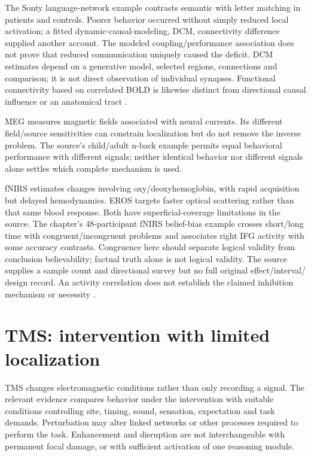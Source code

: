 The Sonty language-network example contrasts semantic with letter
matching in patients and controls. Poorer behavior occurred without
simply reduced local activation; a fitted dynamic-causal-modeling,
DCM, connectivity difference supplied another account. The modeled
coupling/performance association does not prove that reduced
communication uniquely caused the deficit. DCM estimates depend
on a generative model, selected regions, connections and comparison;
it is not direct observation of individual synapses. Functional
connectivity based on correlated BOLD is likewise distinct from
directional causal influence or an anatomical tract
\cite[pp.~80, 84]{MorrisonKnowlton2012Methods}.

MEG measures magnetic fields associated with neural currents.
Its different field/source sensitivities can constrain localization
but do not remove the inverse problem. The source's child/adult
n-back example permits equal behavioral performance with different
signals; neither identical behavior nor different signals alone
settles which complete mechanism is used.

fNIRS estimates changes involving oxy/deoxyhemoglobin, with rapid
acquisition but delayed hemodynamics. EROS targets faster optical
scattering rather than that same blood response. Both have
superficial-coverage limitations in the source. The chapter's
48-participant fNIRS belief-bias example crosses short/long time
with congruent/incongruent problems and associates right IFG
activity with some accuracy contrasts. Congruence here should
separate logical validity from conclusion believability; factual
truth alone is not logical validity. The source supplies a sample
count and directional survey but no full original effect/interval/
design record. An activity correlation does not establish the
claimed inhibition mechanism or necessity
\cite[pp.~80--81]{MorrisonKnowlton2012Methods}.

\section{TMS: intervention with limited localization}
\label{sec:p19-ncm-tms}

TMS changes electromagnetic conditions rather than only recording
a signal. The relevant evidence compares behavior under the
intervention with suitable conditions controlling site, timing,
sound, sensation, expectation and task demands. Perturbation may
alter linked networks or other processes required to perform
the task. Enhancement and disruption are not interchangeable
with permanent focal damage, or with sufficient activation of
one reasoning module.

